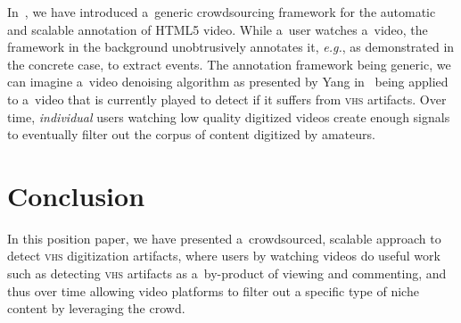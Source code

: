 \documentclass[runningheads,a4paper]{llncs}
\begin{document}
In~\cite{steiner2011crowdsourcing}, we have introduced
a~generic crowdsourcing framework for the automatic and scalable
annotation of HTML5 video.
While a~user watches a~video, the framework in the background
unobtrusively annotates it, \emph{e.g.}, as demonstrated
in the concrete case, to extract events.
The annotation framework being generic,
we can imagine a~video denoising algorithm
as presented by Yang in~\cite{yang2009videonoise}
being applied to a~video that is currently played
to detect if it suffers from {\scshape vhs} artifacts.
Over time, \emph{individual} users watching low quality digitized videos
create enough signals to eventually filter out the corpus of
content digitized by amateurs.

\vspace{-1em}
\section{Conclusion}
\vspace{-.7em}

In this position paper, we have presented a~crowdsourced,
scalable approach to detect {\scshape vhs} digitization artifacts,
where users by watching videos do useful work such as
detecting {\scshape vhs} artifacts as a~by-product of viewing and commenting,
and thus over time allowing video platforms to filter out
a specific type of niche content by leveraging the crowd.

\vspace{-1em}

\footnotesize

\renewcommand\refname{}
\vspace{-2em}

\end{document}
